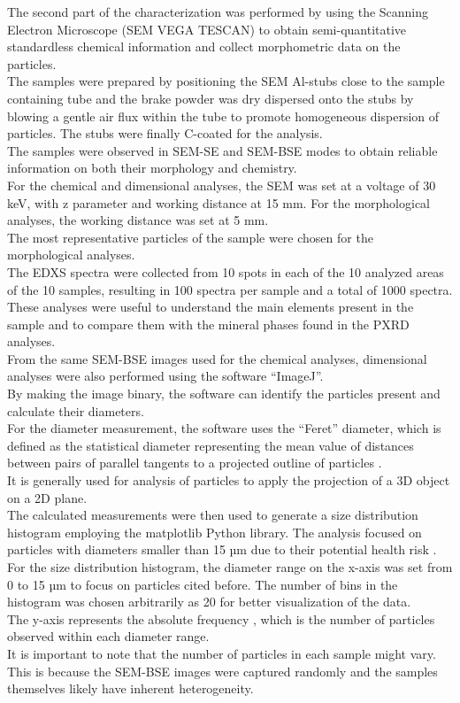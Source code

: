 The second part of the characterization was performed by using the Scanning Electron Microscope (SEM VEGA TESCAN) to obtain semi-quantitative standardless chemical information and collect morphometric data on the particles. \\
The samples were prepared by positioning the SEM Al-stubs close to the sample containing tube and the brake powder was dry dispersed onto the stubs by blowing a gentle air flux within the tube to promote homogeneous dispersion of particles. The stubs were finally C-coated for the analysis. \\
The samples were observed in SEM-SE and SEM-BSE modes to obtain reliable information on both their morphology and chemistry. \\
For the chemical and dimensional analyses, the SEM was set at a voltage of 30 keV, with z parameter and working distance at 15 mm. For the morphological analyses, the working distance was set at 5 mm. \\
The most representative particles of the sample were chosen for the morphological analyses.\\
The EDXS spectra were collected from 10 spots in each of the 10 analyzed areas of the 10 samples, resulting in 100 spectra per sample and a total of 1000 spectra.
These analyses were useful to understand the main elements present in the sample and to compare them with the mineral phases found in the PXRD analyses. \\

From the same SEM-BSE images used for the chemical analyses, dimensional analyses were also performed using the software “ImageJ”. \\
By making the image binary, the software can identify the particles present and calculate their diameters. \\
For the diameter measurement, the software uses the “Feret” diameter, which is defined as the statistical diameter representing the mean value of distances between pairs of parallel tangents to a projected outline of particles \cite{wang}. \\
It is generally used for analysis of particles to apply the projection of a 3D object on a 2D plane. \\
The calculated measurements were then used to generate a size distribution histogram employing the matplotlib Python library. The analysis focused on particles with diameters smaller than 15 µm due to their potential health risk \cite{epaHealthEnvironmental}. \\
For the size distribution histogram, the diameter range on the x-axis was set from 0 to 15 µm to focus on particles cited before. The number of bins in the histogram was chosen arbitrarily as 20 for better visualization of the data. \\
The y-axis represents the absolute frequency , which is the number of particles observed within each diameter range. \\
It is important to note that the number of particles in each sample might vary. This is because the SEM-BSE images were captured randomly and the samples themselves likely have inherent heterogeneity. \\

